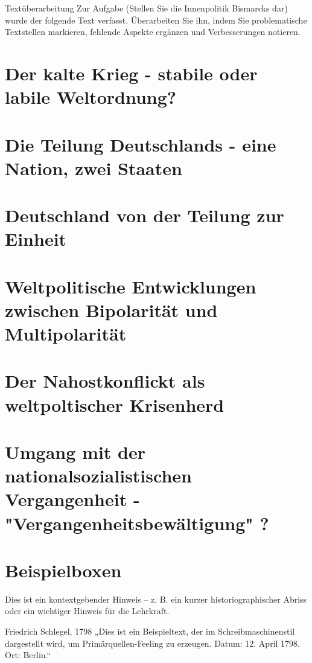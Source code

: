 \documentclass[11pt,a4paper,oneside]{article}
\begin{document}
	\begin{histaufgabe}{Textüberarbeitung}
		Zur Aufgabe (Stellen Sie die Innenpolitik Bismarcks dar) wurde der folgende Text verfasst. Überarbeiten Sie ihn, indem Sie problematische Textstellen markieren, fehlende Aspekte ergänzen und Verbesserungen notieren.
	\end{histaufgabe}
	
	
	\newpage
	
	
	\section{Der kalte Krieg - stabile oder labile Weltordnung?}
	\section{Die Teilung Deutschlands - eine Nation, zwei Staaten}
	\section{Deutschland von der Teilung zur Einheit}
	\section{Weltpolitische Entwicklungen zwischen Bipolarität und Multipolarität}
	\section{Der Nahostkonflickt als weltpoltischer Krisenherd}
	\section{Umgang mit der nationalsozialistischen Vergangenheit - "Vergangenheitsbewältigung" ?}
	
	\newpage
	
	\section{Beispielboxen}
	
	\begin{histnote}
		Dies ist ein kontextgebender Hinweis – z. B. ein kurzer historiographischer Abriss oder ein wichtiger Hinweis für die Lehrkraft.
	\end{histnote}

	
	\begin{primarysource}{Friedrich Schlegel, 1798}
		„Dies ist ein Beispieltext, der im Schreibmaschinenstil dargestellt wird, um Primärquellen-Feeling zu erzeugen.
		Datum: 12. April 1798. Ort: Berlin.“
	\end{primarysource}
	
\end{document}

